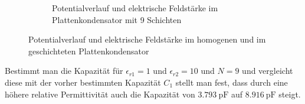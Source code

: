 \begin{figure}[h]
\begin{subfigure}[c]{0.35\textwidth}
		\caption{Potentialverlauf und elektrische Feldstärke im Plattenkondensator mit 9 Schichten}
		\label{fig:N9_EFeld}
\end{subfigure}
	\caption{Potentialverlauf und elektrische Feldstärke im homogenen und im geschichteten Plattenkondensator}
\end{figure}

Bestimmt man die Kapazität für $\epsilon_{r1} = 1$ und $\epsilon_{r2} = 10$ und $N = 9$ und vergleicht diese mit der vorher bestimmten Kapazität $C_1$ stellt man fest, dass durch eine höhere relative Permittivität auch die Kapazität von $\SI{3,793}{\pico\farad}$ auf $\SI{8,916}{\pico\farad}$ steigt.


